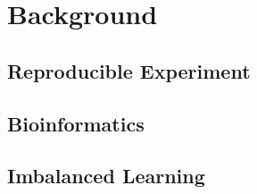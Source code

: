 \chapter{Background}

\section{Reproducible Experiment}


\section{Bioinformatics}


\section{Imbalanced Learning}
